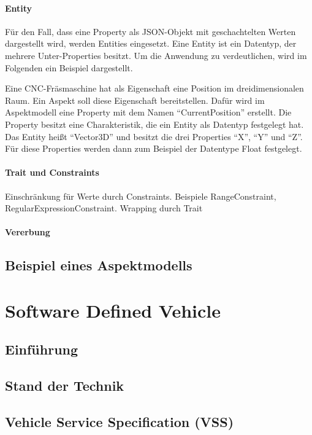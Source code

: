 		\paragraph{Entity} Für den Fall, dass eine Property als JSON-Objekt mit geschachtelten Werten dargestellt wird, werden Entities eingesetzt. Eine Entity ist ein Datentyp, der mehrere Unter-Properties besitzt. Um die Anwendung zu verdeutlichen, wird im Folgenden ein Beispiel dargestellt.
		
		Eine CNC-Fräsmaschine hat als Eigenschaft eine Position im dreidimensionalen Raum. Ein Aspekt soll diese Eigenschaft bereitstellen. Dafür wird im Aspektmodell eine Property mit dem Namen "`CurrentPosition"' erstellt. Die Property besitzt eine Charakteristik, die ein Entity als Datentyp festgelegt hat. Das Entity heißt "`Vector3D"' und besitzt die drei Properties "`X"', "`Y"' und "`Z"'. Für diese Properties werden dann zum Beispiel der Datentype Float festgelegt.
		
		\paragraph{Trait und Constraints}
		{\color{red} Einschränkung für Werte durch Constraints. Beispiele RangeConstraint, RegularExpressionConstraint. Wrapping durch Trait}
		\paragraph{Vererbung}

	\subsection{Beispiel eines Aspektmodells}

\section{Software Defined Vehicle}

	\subsection{Einführung}
	\subsection{Stand der Technik}
	\subsection{Vehicle Service Specification (VSS)}


